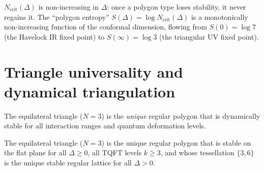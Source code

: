 \begin{corollary}
\label{cor:c-theorem}
$N_{\mathrm{crit}}(\Delta)$ is non-increasing in $\Delta$: once a
polygon type loses stability, it never regains it.
The ``polygon entropy'' $S(\Delta) = \log N_{\mathrm{crit}}(\Delta)$
is a monotonically non-increasing function of the conformal dimension,
flowing from $S(0) = \log 7$ (the Havelock IR fixed point)
to $S(\infty) = \log 3$ (the triangular UV fixed point).
\end{corollary}

\section{Triangle universality and dynamical triangulation}
\label{sec:triangle}

The equilateral triangle ($N = 3$) is the \emph{unique} regular
polygon that is dynamically stable for all interaction ranges
and quantum deformation levels.

\begin{theorem}
\label{thm:triangle-universality}
The equilateral triangle ($N = 3$) is the unique regular polygon
that is stable on the flat plane for all $\Delta \ge 0$,
all TQFT levels $k \ge 3$, and whose tessellation
$\{3,6\}$ is the unique stable regular lattice for all $\Delta > 0$.
\end{theorem}

